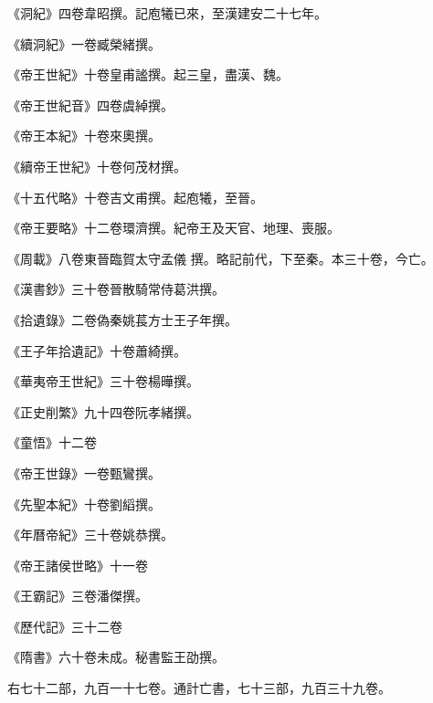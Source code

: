\begin{pinyinscope}
 《洞紀》四卷韋昭撰。記庖犧已來，至漢建安二十七年。



 《續洞紀》一卷臧榮緒撰。



 《帝王世紀》十卷皇甫謐撰。起三皇，盡漢、魏。



 《帝王世紀音》四卷虞綽撰。



 《帝王本紀》十卷來奧撰。



 《續帝王世紀》十卷何茂材撰。



 《十五代略》十卷吉文甫撰。起庖犧，至晉。



 《帝王要略》十二卷環濟撰。紀帝王及天官、地理、喪服。



 《周載》八卷東晉臨賀太守孟儀
 撰。略記前代，下至秦。本三十卷，今亡。



 《漢書鈔》三十卷晉散騎常侍葛洪撰。



 《拾遺錄》二卷偽秦姚萇方士王子年撰。



 《王子年拾遺記》十卷蕭綺撰。



 《華夷帝王世紀》三十卷楊曄撰。



 《正史削繁》九十四卷阮孝緒撰。



 《童悟》十二卷



 《帝王世錄》一卷甄鸞撰。



 《先聖本紀》十卷劉縚撰。



 《年曆帝紀》三十卷姚恭撰。



 《帝王諸侯世略》十一卷



 《王霸記》三卷潘傑撰。



 《歷代記》三十二卷



 《隋書》六十卷未成。秘書監王劭撰。



 右七十二部，九百一十七卷。通計亡書，七十三部，九百三十九卷。




\end{pinyinscope}
